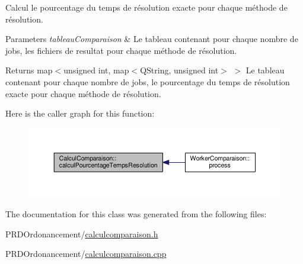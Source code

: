 Calcul le pourcentage du temps de résolution exacte pour chaque méthode de résolution. 


\begin{DoxyParams}{Parameters}
{\em tableau\+Comparaison} & Le tableau contenant pour chaque nombre de jobs, les fichiers de resultat pour chaque méthode de résolution. \\
\hline
\end{DoxyParams}
\begin{DoxyReturn}{Returns}
map$<$unsigned int, map$<$\+Q\+String, unsigned int$>$ $>$ Le tableau contenant pour chaque nombre de jobs, le pourcentage du temps de résolution exacte pour chaque méthode de résolution. 
\end{DoxyReturn}
Here is the caller graph for this function\+:\nopagebreak
\begin{figure}[H]
\begin{center}
\leavevmode
\includegraphics[width=350pt]{classCalculComparaison_a95460e5474d2abafd7a1c861d65785ea_icgraph}
\end{center}
\end{figure}


The documentation for this class was generated from the following files\+:\begin{DoxyCompactItemize}
\item 
P\+R\+D\+Ordonancement/\hyperlink{calculcomparaison_8h}{calculcomparaison.\+h}\item 
P\+R\+D\+Ordonancement/\hyperlink{calculcomparaison_8cpp}{calculcomparaison.\+cpp}\end{DoxyCompactItemize}

